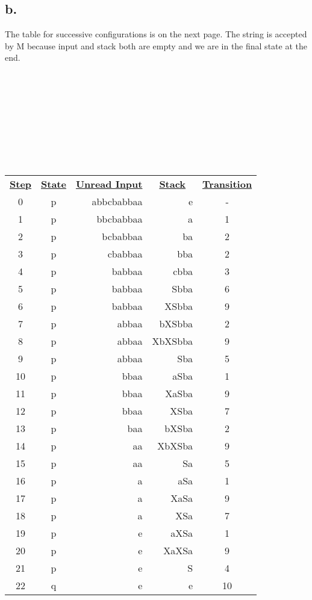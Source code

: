 \documentclass[12pt]{article}
\begin{document}
\subsection*{b.}
The table for successive configurations is on the next page. The string is accepted by M because input and stack both are empty and we are in the final state at the end. \\ \\ \\ \\ \\ \\ \\ \\ \\ 
\begin{table}[]
\centering
\caption{}
\label{my-label}
\begin{tabular}{ccrrc}
{\ul \textbf{Step}} & {\ul \textbf{State}} & {\ul \textbf{Unread Input}} & \multicolumn{1}{c}{{\ul \textbf{Stack}}} & {\ul \textbf{Transition}} \\
0 & p & abbcbabbaa & e & - \\
1 & p & bbcbabbaa & a & 1 \\
2 & p & bcbabbaa & ba & 2 \\
3 & p & cbabbaa & bba & 2 \\
4 & p & babbaa & cbba & 3 \\
5 & p & babbaa & Sbba & 6 \\
6 & p & babbaa & XSbba & 9 \\
7 & p & abbaa & bXSbba & 2 \\
8 & p & abbaa & XbXSbba & 9 \\
9 & p & abbaa & Sba & 5 \\
10 & p & bbaa & aSba & 1 \\
11 & p & bbaa & XaSba & 9 \\
12 & p & bbaa & XSba & 7 \\
13 & p & baa & bXSba & 2 \\
14 & p & aa & XbXSba & 9 \\
15 & p & aa & Sa & 5 \\
16 & p & a & aSa & 1 \\
17 & p & a & XaSa & 9 \\
18 & p & a & XSa & 7 \\
19 & p & e & aXSa & 1 \\
20 & p & e & XaXSa & 9 \\
21 & p & e & S & 4 \\
22 & q & e & e & 10
\end{tabular}
\end{table} 
\end{document}
